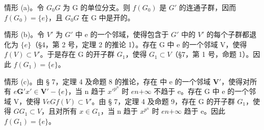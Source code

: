 情形 (a)。令 \(G_0\)\(G\) 为 G 的单位分支。则 \(f(G_0)\) 是 \(G'\) 的连通子群，因而 \(f(G_0) = \{e\}\)，且 \(G_0\)\(G\) 在 G 中是开的。

情形 (b)。令 \(V'\) 为 \(G'\) 中 e 的一个邻域，使得包含于 \(G'\) 中的 \(V'\) 的每个子群都退化为 \(\{e\}\)（§4，第 2 号，定理 2 的推论 1）。存在 G 中 e 的一个邻域 V，使得 \(f(V) \subset V'\)。于是存在 G 的开子群 \(G_{1}\)，使得 \(G_{1} \subset V\)（§7，第 1 号，命题 1）。因此 \(f(G_{1}) = \{e\}\)。

情形 (c)。由 § 7，定理 4 及命题 8 的推论，存在  中 e 的一个邻域 \(\mathbf{V}'\)，使得对所有 \(e\)\(\mathbf{G}'\)\(x' \in \mathbf{V}' - \{e\}\)，当 n 趋于 \(x'^{p^n}\) 时 \(e\)\(n\)\(+\infty\) 不趋于 e。存在 G 中 e 的一个邻域 V，使得 \(V\)\(e\)\(G\)\(f(V) \subset V'\)。由 § 7，定理 4 及命题 9，存在 G 的开子群 \(G_1\)，使得 \(G\)\(G_1 \subset V\)，且对所有 \(x \in G_1\)，当 n 趋于 \(x^{p^n}\) 时 \(e\)\(n\)\(+\infty\) 趋于 e。因此 \(f(G_1) = \{e\}\)。

